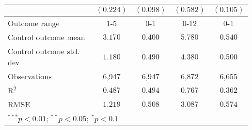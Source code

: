 \begin{table}
\begin{center}
\begin{tabular}{l c c c c}
                                                          & $(0.224)$    & $(0.098)$    & $(0.582)$     & $(0.105)$ \\
\hline
Outcome range                                             & 1-5          & 0-1          & 0-12          & 0-1       \\
Control outcome mean                                      & $3.170$      & $0.400$      & $5.780$       & $0.540$   \\
Control outcome std. dev                                  & $1.180$      & $0.490$      & $4.380$       & $0.500$   \\
Observations                                              & 6,947        & 6,947        & 6,872         & 6,655     \\
R$^{2}$                                                   & $0.487$      & $0.494$      & $0.767$       & $0.362$   \\
RMSE                                                      & $1.219$      & $0.508$      & $3.087$       & $0.574$   \\
\hline
\multicolumn{5}{l}{\scriptsize{$^{***}p<0.01$; $^{**}p<0.05$; $^{*}p<0.1$}}
\end{tabular}
\caption{}
\label{table:Tables and Figures/SI_table15_allhet_anyinfo}
\end{center}
\end{table}
